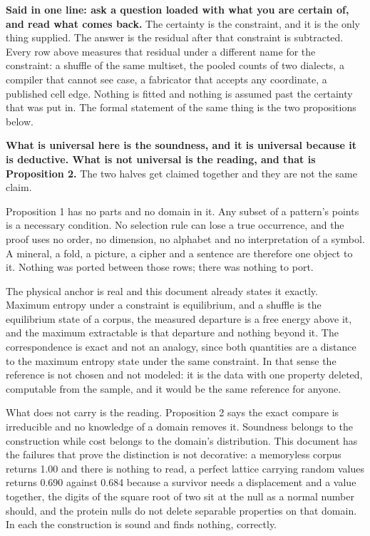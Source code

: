 \textbf{Said in one line: ask a question loaded with what you are certain of, and read what comes back.} The certainty is the constraint, and it is the only thing supplied. The answer is the residual after that constraint is subtracted. Every row above measures that residual under a different name for the constraint: a shuffle of the same multiset, the pooled counts of two dialects, a compiler that cannot see case, a fabricator that accepts any coordinate, a published cell edge. Nothing is fitted and nothing is assumed past the certainty that was put in. The formal statement of the same thing is the two propositions below.

\textbf{What is universal here is the soundness, and it is universal because it is deductive. What is not universal is the reading, and that is Proposition 2.} The two halves get claimed together and they are not the same claim.

Proposition 1 has no parts and no domain in it. Any subset of a pattern's points is a necessary condition. No selection rule can lose a true occurrence, and the proof uses no order, no dimension, no alphabet and no interpretation of a symbol. A mineral, a fold, a picture, a cipher and a sentence are therefore one object to it. Nothing was ported between those rows; there was nothing to port.

The physical anchor is real and this document already states it exactly. Maximum entropy under a constraint is equilibrium, and a shuffle is the equilibrium state of a corpus, the measured departure is a free energy above it, and the maximum extractable is that departure and nothing beyond it. The correspondence is exact and not an analogy, since both quantities are a distance to the maximum entropy state under the same constraint. In that sense the reference is not chosen and not modeled: it is the data with one property deleted, computable from the sample, and it would be the same reference for anyone.

What does not carry is the reading. Proposition 2 says the exact compare is irreducible and no knowledge of a domain removes it. Soundness belongs to the construction while cost belongs to the domain's distribution. This document has the failures that prove the distinction is not decorative: a memoryless corpus returns 1.00 and there is nothing to read, a perfect lattice carrying random values returns 0.690 against 0.684 because a survivor needs a displacement and a value together, the digits of the square root of two sit at the null as a normal number should, and the protein nulls do not delete separable properties on that domain. In each the construction is sound and finds nothing, correctly.

